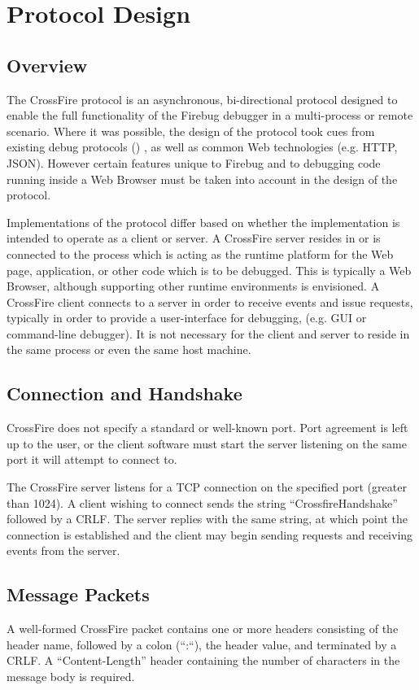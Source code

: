 \section {Protocol Design}
\subsection {Overview}
The CrossFire protocol is an asynchronous, bi-directional protocol designed to
enable the full functionality of the Firebug debugger in a multi-process or
remote scenario. Where it was possible, the design of the protocol took cues
from existing debug protocols () , as well as common Web
technologies (e.g. HTTP\cite{http}, JSON\cite{json}). However certain features unique to Firebug
and to debugging code running inside a Web Browser must be taken into account
in the design of the protocol.

Implementations of the protocol differ based on whether the implementation is
intended to operate as a client or server. A CrossFire server resides in or is
connected to the process which is acting as the runtime platform for the Web
page, application, or other code which is to be debugged. This is typically a
Web Browser, although supporting other runtime environments is envisioned. A
CrossFire client connects to a server in order to receive events and issue
requests, typically in order to provide a user-interface
for debugging, (e.g. GUI or command-line debugger). It is not necessary for the
client and server to reside in the same process or even the same host machine.

\subsection {Connection and Handshake}
CrossFire does not specify a standard or well-known port. Port agreement is left
up to the user, or the client software must start the server listening on
the same port it will attempt to connect to.

The CrossFire server listens for a TCP connection on the specified port
(greater than 1024).  A client wishing to connect sends the string
``CrossfireHandshake'' followed by a CRLF. The server replies with the same
string, at which point the connection is established and the client may begin
sending requests and receiving events from the server.

\subsection {Message Packets}
A well-formed CrossFire packet contains one or more headers consisting of the
header name, followed by a colon (``:``), the header value, and terminated by a
CRLF. A ``Content-Length'' header containing the number of characters in the
message body is required.

